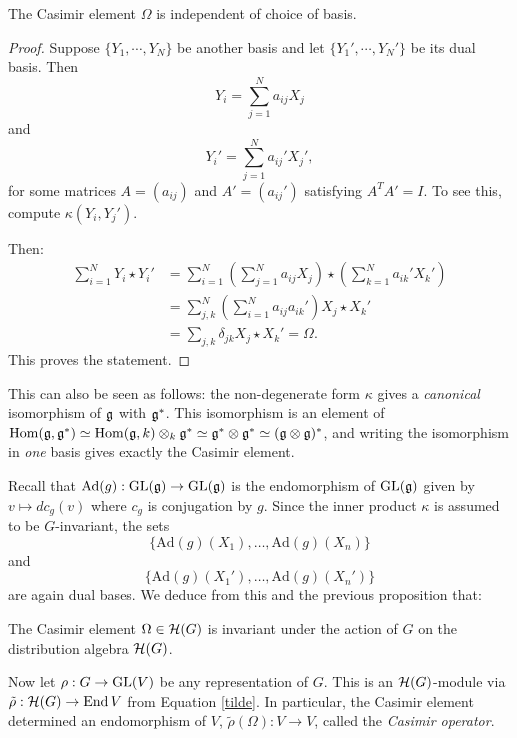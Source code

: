 \documentclass[11pt, english]{article}
\begin{document}
\begin{prop}
 The Casimir element $\Omega$ is independent of choice of basis.
\end{prop}
\begin{proof}
Suppose $\{ Y_1, \cdots, Y_N \}$ be another basis and let $ \{ Y_1',\cdots, Y_N'\}$ be its dual basis. Then
$$
Y_i = \sum_{j=1}^N a_{ij} X_j
$$
and
$$
Y_i' = \sum_{j=1}^N a_{ij}' X_j',
$$
for some matrices $A=(a_{ij})$ and $A'=(a_{ij}')$ satisfying $A^TA'=I$. To see this, compute $\kappa(Y_i,Y_j')$.

Then:
\begin{align*}
\sum_{i=1}^N Y_i \star Y_i' &= \sum_{i=1}^N\left(\sum_{j=1}^N a_{ij} X_j \right) \star \left( \sum_{k=1}^N a_{ik}' X_k' \right) \\
&= \sum_{j,k}^N \left( \sum_{i=1}^N a_{ij} a_{ik}' \right) X_j \star X_k' \\
&= \sum_{j,k} \delta_{jk} X_j \star X_k' = \Omega.
\end{align*}
This proves the statement.
\end{proof}
\begin{remark}
This can also be seen as follows: the non-degenerate form $\kappa$ gives a \emph{canonical} isomorphism of $\mathfrak g$ with $\mathfrak g^\ast$. This isomorphism is an element of $\operatorname{Hom}(\mathfrak g,\mathfrak g^\ast)\simeq \operatorname{Hom}(\mathfrak g,k) \otimes_k \mathfrak g^\ast \simeq \mathfrak g^\ast \otimes \mathfrak g^\ast \simeq (\mathfrak g \otimes \mathfrak g)^\ast$, and writing the isomorphism in \emph{one} basis gives exactly the Casimir element.
\end{remark}

Recall that $\mathrm{Ad}(g):\operatorname{GL}(\mathfrak g) \to \operatorname{GL}(\mathfrak g)$ is the endomorphism of $\operatorname{GL}(\mathfrak g)$ given by $v \mapsto dc_g(v)$ where $c_g$ is conjugation by $g$. Since the inner product $\kappa$ is assumed to be $G$-invariant, the sets
$$
\{ \mathrm{Ad}(g)(X_1),\ldots, \mathrm{Ad}(g)(X_n) \}
$$
and
$$
\{ \mathrm{Ad}(g)(X_1'),\ldots, \mathrm{Ad}(g)(X_n') \}
$$
are again dual bases. We deduce from this and the previous proposition that:
\begin{corr}
The Casimir element $\Omega \in \mathcal{H}(G)$ is invariant under the action of $G$ on the distribution algebra $\mathcal{H}(G)$.
\end{corr}

Now let $\rho: G \to \operatorname{GL}(V)$ be any representation of $G$. This is an $\mathcal{H}(G)$-module via $\tilde \rho:\mathcal{H}(G) \to \operatorname{End} V$ from Equation \ref{tilde}. In particular, the Casimir element determined an endomorphism of $V$, $\tilde \rho (\Omega): V \to V$, called the \emph{Casimir operator}.
\end{document}
